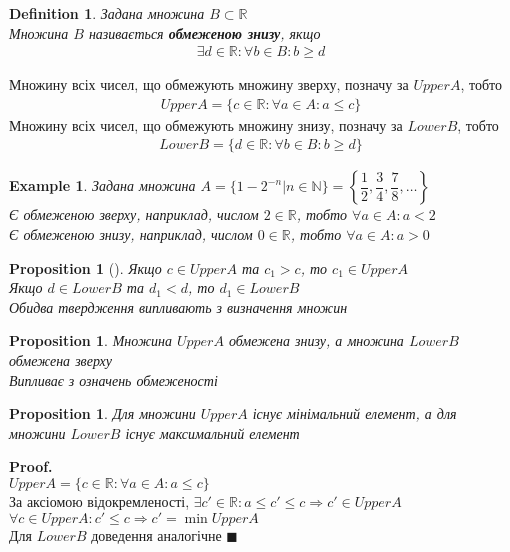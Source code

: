 \documentclass[a4paper, 14pt]{extarticle}
\theoremstyle{theoremdd}
\theoremstyle{theoremdd}
\newtheorem{definition}[theorem]{Definition}
\theoremstyle{theoremdd}
\theoremstyle{theoremdd}
\newtheorem{example}[theorem]{Example}
\theoremstyle{theoremdd}
\newtheorem{proposition}[theorem]{Proposition}
\theoremstyle{theoremdd}
\theoremstyle{theoremdd}
\theoremstyle{theoremdd}
\newenvironment{pf}{\vspace*{-3mm} \textbf{Proof. \\}}{$\blacksquare$}
\begin{document}
	\begin{definition}
	Задана множина $B \subset \mathbb{R}$\\
	Множина $B$ називається \textbf{обмеженою знизу}, якщо
	\begin{align*}
	\exists d \in \mathbb{R}: \forall b \in B: b \geq d
	\end{align*}
	\end{definition}
	
	Множину всіх чисел, що обмежують множину зверху, позначу за $UpperA$, тобто
	\begin{align*}
	UpperA = \{c \in \mathbb{R}: \forall a \in A: a \leq c \}
	\end{align*}
	Множину всіх чисел, що обмежують множину знизу, позначу за $LowerB$, тобто
	\begin{align*}
	LowerB = \{d \in \mathbb{R}: \forall b \in B: b \geq d \}
	\end{align*}
	\begin{example}
	Задана множина $A = \{1-2^{-n} | n \in \mathbb{N}\} = \left\{\dfrac{1}{2}, \dfrac{3}{4}, \dfrac{7}{8}, \dots \right\}$\\
	Є обмеженою зверху, наприклад, числом $2 \in \mathbb{R}$, тобто $\forall a \in A: a < 2$\\
	Є обмеженою знизу, наприклад, числом $0 \in \mathbb{R}$, тобто $\forall a \in A: a > 0$
	\end{example}
	
	\begin{proposition}[\hspace{0.1cm}]
	Якщо $c \in UpperA$ та $c_1 > c$, то $c_1 \in UpperA$\\
	Якщо $d \in LowerB$ та $d_1 < d$, то $d_1 \in LowerB$\\
	\textit{Обидва твердження випливають з визначення множин}
	\end{proposition}
	
	\begin{proposition}
	Множина $UpperA$ обмежена знизу, а множина $LowerB$ обмежена зверху\\
	\textit{Випливає з означень обмеженості}	
	\end{proposition}
	
	\begin{proposition}
	Для множини $UpperA$ існує мінімальний елемент, а для множини $LowerB$ існує максимальний елемент
	\end{proposition}
	\begin{pf}
	$UpperA = \{c \in \mathbb{R}: \forall a \in A: a \leq c \}$\\ За аксіомою відокремленості, $\exists c' \in \mathbb{R}: a \leq c' \leq c \Rightarrow c' \in UpperA$\\
	$\forall c \in UpperA: c' \leq c \Rightarrow c' = \min UpperA$\\
	Для $LowerB$ доведення аналогічне
	\end{pf}
	
\end{document}
